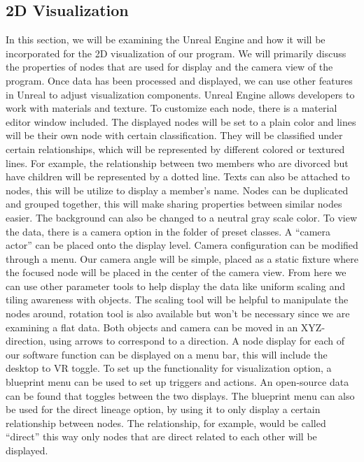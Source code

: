 \documentclass[onecolumn, draftclsnofoot, 10pt, compsoc]{IEEEtran}
\begin{document}
\subsection{2D Visualization}
\begin{singlespace}
In this section, we will be examining the Unreal Engine and how it will be incorporated for the 2D visualization of our program. We will primarily discuss the properties of nodes that are used for display and the camera view of the program.
\newline
\newline
Once data has been processed and displayed, we can use other features in Unreal to adjust visualization components. Unreal Engine allows developers to work with materials and texture. To customize each node, there is a material editor window included. The displayed nodes will be set to a plain color and lines will be their own node with certain classification. They will be classified under certain relationships, which will be represented by different colored or textured lines. For example, the relationship between two members who are divorced but have children will be represented by a dotted line. Texts can also be attached to nodes, this will be utilize to display a member’s name. Nodes can be duplicated and grouped together, this will make sharing properties between similar nodes easier. The background can also be changed to a neutral gray scale color.
\newline
\newline
To view the data, there is a camera option in the folder of preset classes. A “camera actor” can be placed onto the display level. Camera configuration can be modified through a menu. Our camera angle will be simple, placed as a static fixture where the focused node will be placed in the center of the camera view. From here we can use other parameter tools to help display the data like uniform scaling and tiling awareness with objects. The scaling tool will be helpful to manipulate the nodes around, rotation tool is also available but won’t be necessary since we are examining a flat data. Both objects and camera can be moved in an XYZ-direction, using arrows to correspond to a direction.
\newline
\newline
A node display for each of our software function can be displayed on a menu bar, this will include the desktop to VR toggle. To set up the functionality for visualization option, a blueprint menu can be used to set up triggers and actions. An open-source data can be found that toggles between the two displays. The blueprint menu can also be used for the direct lineage option, by using it to only display a certain relationship between nodes. The relationship, for example, would be called “direct” this way only nodes that are direct related to each other will be displayed.

\end{singlespace}
\end{document}
